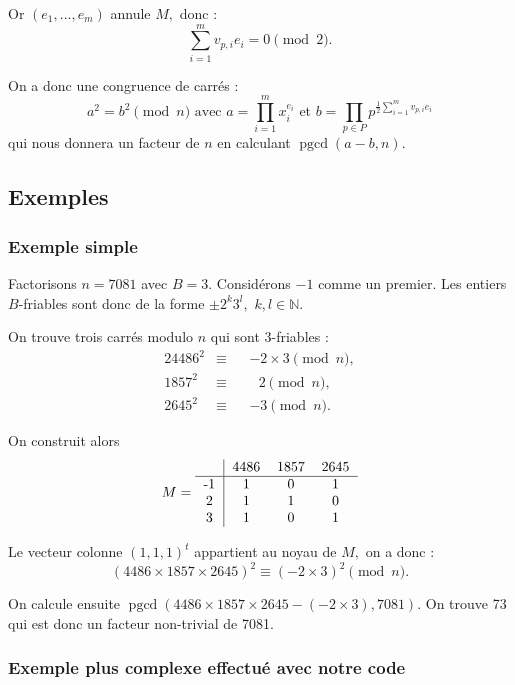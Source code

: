 \documentclass[french, 12pt, titlepage]{article}
\DeclareMathOperator{\pgcd}{pgcd}
\newcommand{\N}{\mathbb{N}}
\begin{document}
Or $(e_1, ..., e_m)$ annule $M,$ donc : \[\sum\limits_{i=1}^m v_{p,
  i}e_i = 0 \pmod 2.\]

On a donc une congruence de carrés : \[a^2 = b^2 \pmod n \text{ avec } a = \prod\limits_{i=1}^m x_i^{e_i} \text{ et } b = \prod\limits_{p \in P} p^{\frac{1}{2} \sum\limits_{i=1}^m v_{p, i}e_i}\] qui nous donnera un facteur
de $n$ en calculant $\pgcd(a - b, n).$

\subsection{Exemples}

\subsubsection{Exemple simple}

Factorisons $n = 7081$ avec $B = 3.$ Considérons $-1$ comme un
premier. Les entiers $B$-friables sont donc de la forme $\pm2^k3^l,$
$k, l \in \N.$ 

On trouve trois carrés modulo $n$ qui sont 3-friables :
\begin{alignat*}{2}
4486^2 & \equiv && -\!2 \times 3 \pmod n, \\
1857^2 & \equiv && \text{ } 2 \pmod n, \\
2645^2 & \equiv && -\!3 \pmod n.
\end{alignat*}

On construit alors \[M = \begin{tabular}{c|ccc}
                            & 4486 & 1857 & 2645 \\
                           \hline
                           -1 & 1 & 0 & 1 \\
                           2 & 1 & 1 & 0 \\
                           3 & 1 & 0 & 1 \\
                         \end{tabular}\]

Le vecteur colonne $(1, 1, 1)^t$ appartient au noyau de $M,$ on a donc
: \[(4486 \times 1857 \times 2645)^2 \equiv (-2 \times 3)^2 \pmod
n.\]

On calcule ensuite $\pgcd(4486 \times 1857 \times 2645 - (-2 \times
3), 7081).$ On trouve 73 qui est donc un facteur non-trivial de 7081.

\subsubsection{Exemple plus complexe effectué avec notre code}
\end{document}
